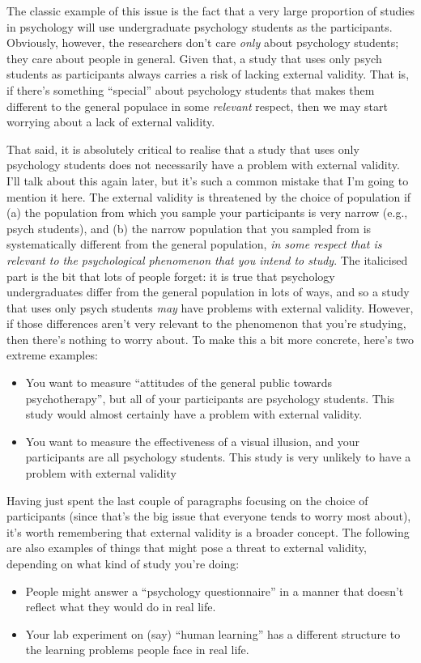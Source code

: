 The classic example of this issue is the fact that a very large proportion of studies in psychology will use undergraduate psychology students as the participants. Obviously, however, the researchers don't care {\it only} about psychology students; they care about people in general. Given that, a study that uses only psych students as participants always carries a risk of lacking external validity. That is, if there's something ``special'' about psychology students that makes them different to the general populace in some {\it relevant} respect, then we may start worrying about a lack of external validity.

That said, it is absolutely critical to realise that a study that uses only psychology students does not necessarily have a problem with external validity. I'll talk about this again later, but it's such a common mistake that I'm going to mention it here. The external validity is threatened by the choice of population if (a) the population from which you sample  your participants is very narrow (e.g., psych students), and (b) the narrow population that you sampled from is systematically different from the general population, {\it in some respect that is relevant to the psychological phenomenon that you intend to study}. The italicised part is the bit that lots of people forget: it is true that psychology undergraduates differ from the general population in lots of ways, and so a study that uses only psych students {\it may} have problems with external validity. However, if those differences aren't very relevant to the phenomenon that you're studying, then there's nothing to worry about. To make this a bit more concrete, here's two extreme examples:
\begin{itemize}
\item You want to measure ``attitudes of the general public towards psychotherapy'', but all of your participants are psychology students. This study would almost certainly have a problem with external validity.
\item You want to measure the effectiveness of a visual illusion, and your participants are all psychology students. This study is very unlikely to have a problem with external validity
\end{itemize}

Having just spent the last couple of paragraphs focusing on the choice of participants (since that's the big issue that everyone tends to worry most about), it's worth remembering that external validity is a broader concept. The following are also examples of things that might pose a threat to external validity, depending on what kind of study you're doing:
\begin{itemize}
\item People might answer a ``psychology questionnaire'' in a manner that doesn't reflect what they would do in real life.
\item Your lab experiment on (say) ``human learning'' has a different structure to the learning problems people face in real life.
\end{itemize}


